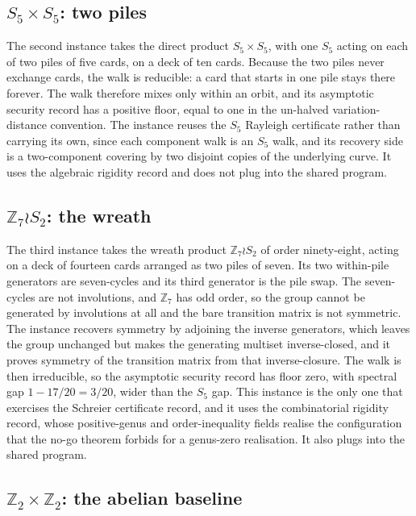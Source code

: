 \documentclass[a4paper,11pt]{article}
\begin{document}
\subsection{$S_5 \times S_5$: two piles}

The second instance takes the direct product $S_5 \times S_5$, with one $S_5$
acting on each of two piles of five cards, on a deck of ten cards. Because the
two piles never exchange cards, the walk is reducible: a card that starts in one
pile stays there forever. The walk therefore mixes only within an orbit, and its
asymptotic security record has a positive floor, equal to one in the un-halved
variation-distance convention. The instance reuses the $S_5$ Rayleigh
certificate rather than carrying its own, since each component walk is an $S_5$
walk, and its recovery side is a two-component covering by two disjoint copies of
the underlying curve. It uses the algebraic rigidity record and does not plug
into the shared program.

\subsection{$\mathbb{Z}_7 \wr S_2$: the wreath}

The third instance takes the wreath product $\mathbb{Z}_7 \wr S_2$ of order
ninety-eight, acting on a deck of fourteen cards arranged as two piles of seven.
Its two within-pile generators are seven-cycles and its third generator is the
pile swap. The seven-cycles are not involutions, and $\mathbb{Z}_7$ has odd
order, so the group cannot be generated by involutions at all and the bare
transition matrix is not symmetric. The instance recovers symmetry by adjoining
the inverse generators, which leaves the group unchanged but makes the
generating multiset inverse-closed, and it proves symmetry of the transition
matrix from that inverse-closure. The walk is then irreducible, so the
asymptotic security record has floor zero, with spectral gap $1 - 17/20 = 3/20$,
wider than the $S_5$ gap. This instance is the only one that exercises the
Schreier certificate record, and it uses the combinatorial rigidity record,
whose positive-genus and order-inequality fields realise the configuration that
the no-go theorem forbids for a genus-zero realisation. It also plugs into the
shared program.

\subsection{$\mathbb{Z}_2 \times \mathbb{Z}_2$: the abelian baseline}
\end{document}
